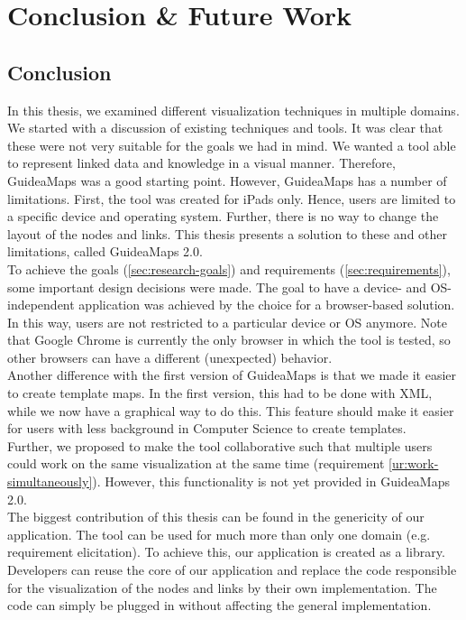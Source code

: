 \chapter{Conclusion \& Future Work}\label{ch:conclusion-future-work}

\section{Conclusion}\label{sec:conclusion}
In this thesis, we examined different visualization techniques in multiple domains. We started with a discussion of existing techniques and tools. It was clear that these were not very suitable for the goals we had in mind. We wanted a tool able to represent linked data and knowledge in a visual manner. Therefore, GuideaMaps was a good starting point. However, GuideaMaps has a number of limitations. First, the tool was created for iPads only. Hence, users are limited to a specific device and operating system. Further, there is no way to change the layout of the nodes and links. This thesis presents a solution to these and other limitations, called GuideaMaps 2.0.\\

To achieve the goals (\autoref{sec:research-goals}) and requirements (\autoref{sec:requirements}), some important design decisions were made. The goal to have a device- and OS-independent application was achieved by the choice for a browser-based solution. In this way, users are not restricted to a particular device or OS anymore. Note that Google Chrome is currently the only browser in which the tool is tested, so other browsers can have a different (unexpected) behavior.\\

Another difference with the first version of GuideaMaps is that we made it easier to create template maps. In the first version, this had to be done with XML, while we now have a graphical way to do this. This feature should make it easier for users with less background in Computer Science to create templates.\\

Further, we proposed to make the tool collaborative such that multiple users could work on the same visualization at the same time (requirement \ref{ur:work-simultaneously}). However, this functionality is not yet provided in GuideaMaps 2.0.\\

The biggest contribution of this thesis can be found in the genericity of our application. The tool can be used for much more than only one domain (e.g. requirement elicitation). To achieve this, our application is created as a library. Developers can reuse the core of our application and replace the code responsible for the visualization of the nodes and links by their own implementation. The code can simply be plugged in without affecting the general implementation.\\

